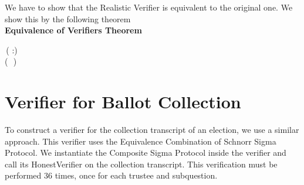 We have to show that the Realistic Verifier is equivalent to the original one.
We show this by the following theorem \\
\textbf{Equivalence of Verifiers Theorem}
\begin{holmath}
    \,( :)\,\HOLSymConst{\HOLTokenImp{}}\\
(\,\,\HOLSymConst{\HOLTokenEquiv{}}\,\,)
\end{holmath}  
\newpage
\section{Verifier for Ballot Collection}
To construct a verifier for the collection transcript of an election, 
we use a similar approach. This verifier uses the Equivalence Combination of Schnorr Sigma Protocol. 
We instantiate the Composite Sigma Protocol inside the verifier and call its 
HonestVerifier on the collection transcript. This verification must be 
performed 36 times, once for each trustee and subquestion.

